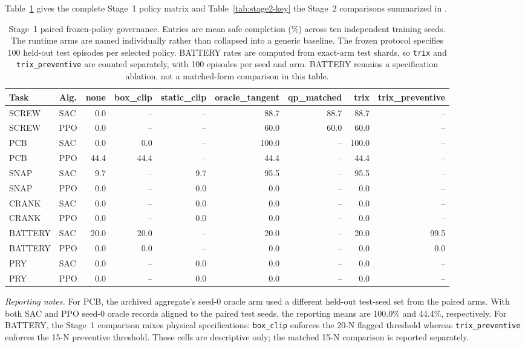 \documentclass[10pt]{article}
\begin{document}
Table~\ref{tab:submitted-4} gives the complete Stage~1 policy matrix and
Table~\ref{tab:stage2-key} the Stage~2 comparisons summarized in
.
\begin{table}[htbp]
\centering
\caption{Stage~1 paired frozen-policy governance. Entries are mean safe
completion (\%) across ten independent training seeds. The runtime arms are
named individually rather than collapsed into a generic baseline. The frozen
protocol specifies 100 held-out test episodes per selected policy. BATTERY
rates are computed from exact-arm test shards, so \texttt{trix} and
\texttt{trix\_preventive} are counted separately, with 100 episodes per seed and arm. BATTERY remains a specification ablation,
not a matched-form comparison in this table.}
\label{tab:submitted-4}
\small
\setlength{\tabcolsep}{4pt}
\begin{tabular}{llrrrrrrr}
\toprule
Task & Alg. & none & box\_clip & static\_clip & oracle\_tangent &
qp\_matched & trix & trix\_preventive\\
\midrule
SCREW & SAC & 0.0 & -- & -- & 88.7 & 88.7 & 88.7 & -- \\
SCREW & PPO & 0.0 & -- & -- & 60.0 & 60.0 & 60.0 & -- \\
PCB & SAC & 0.0 & 0.0 & -- & 100.0 & -- & 100.0 & -- \\
PCB & PPO & 44.4 & 44.4 & -- & 44.4 & -- & 44.4 & -- \\
SNAP & SAC & 9.7 & -- & 9.7 & 95.5 & -- & 95.5 & -- \\
SNAP & PPO & 0.0 & -- & 0.0 & 0.0 & -- & 0.0 & -- \\
CRANK & SAC & 0.0 & -- & 0.0 & 0.0 & -- & 0.0 & -- \\
CRANK & PPO & 0.0 & -- & 0.0 & 0.0 & -- & 0.0 & -- \\
BATTERY & SAC & 20.0 & 20.0 & -- & 20.0 & -- & 20.0 & 99.5 \\
BATTERY & PPO & 0.0 & 0.0 & -- & 0.0 & -- & 0.0 & 0.0 \\
PRY & SAC & 0.0 & -- & 0.0 & 0.0 & -- & 0.0 & -- \\
PRY & PPO & 0.0 & -- & 0.0 & 0.0 & -- & 0.0 & -- \\
\bottomrule
\end{tabular}
\begin{minipage}{0.98\linewidth}
\footnotesize
\textit{Reporting notes.}
For PCB, the archived aggregate's
seed-0 oracle arm used a different held-out test-seed set from the paired
arms. With both SAC and PPO seed-0 oracle records aligned to the paired
test seeds, the reporting means are 100.0\% and 44.4\%, respectively. For BATTERY, the Stage~1 comparison mixes physical
specifications: \texttt{box\_clip} enforces the 20-N flagged threshold whereas
\texttt{trix\_preventive} enforces the 15-N preventive threshold. Those cells
are descriptive only; the matched 15-N comparison is reported separately.
\end{minipage}
\end{table}
\end{document}

